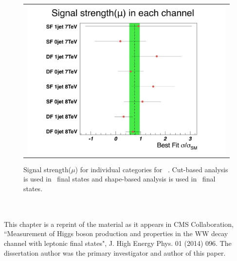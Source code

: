%
\begin{figure}[htp] 
\centering 
\begin{tabular}{c} 
\includegraphics[width=0.99\textwidth]{figures/mu_allchannels.pdf}
\end{tabular} 
\caption{ Signal strength($\mu$) for individual categories for ~\GeV.
Cut-based analysis is used in \SF\ final states 
and shape-based analysis is used in \DF\ final states. }
\label{fig:mu_allchannels} 
\end{figure} 
%
\\
\\

 This chapter is a reprint of the material as it appears in CMS Collaboration, 
 ``Measurement of Higgs boson production and properties in the WW decay channel with 
 leptonic final states", J. High Energy Phys. 01 (2014) 096. 
The dissertation author was the primary investigator and author of this paper. 
